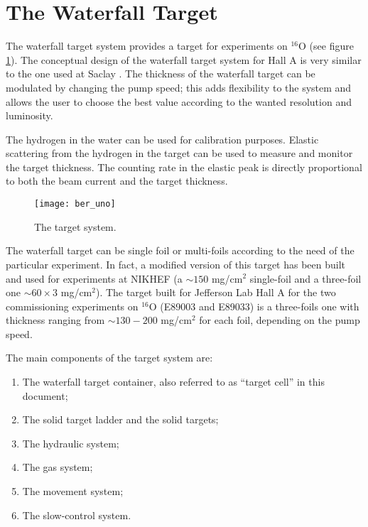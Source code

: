 \section{The Waterfall Target}

The waterfall target system provides a target for experiments on 
$^{16}$O (see figure \ref{fig:uno}). 
The conceptual design of the waterfall target system for Hall A  is
very similar to the one used at Saclay \cite{garibaldi}.
The thickness of the waterfall target can 
be modulated by changing the pump speed; this 
adds flexibility to the system and allows the user to choose the best
value according to the wanted resolution and luminosity.

The hydrogen in the water can be used for calibration purposes.
Elastic scattering  from the hydrogen in the target can be used to 
measure and monitor the target thickness. The counting rate in the elastic
peak is directly proportional to both the beam current and 
the target thickness.

\begin{figure}[htbp]
\begin{center}
\texttt{[image: ber\_uno]}
\caption[Waterfall Target System]{The target system.}
\label{fig:uno}
\end{center}
\end{figure}


The waterfall target can be single foil or multi-foils according to
the need of the particular experiment. In fact, a modified version of this 
target has been built  and used for experiments at NIKHEF (a
$\sim 150$ mg/cm$^2$ single-foil and a three-foil one 
$\sim 60 \times 3$ mg/cm$^2$). 
The target built for Jefferson Lab Hall A for the two commissioning 
experiments on $^{16}$O (E89003 and E89033) is a three-foils  one  with 
thickness ranging from $\sim 130-200$ mg/cm$^2$ for each foil, 
depending on the pump speed. 

The main components of the target system are:
\begin{enumerate}
\item The waterfall target container, also referred to as ``target cell'' in this document;
\item The solid target ladder and the solid targets; 
\item The hydraulic system;
\item The gas system;
\item The movement system;
\item The slow-control system.
\end{enumerate}

